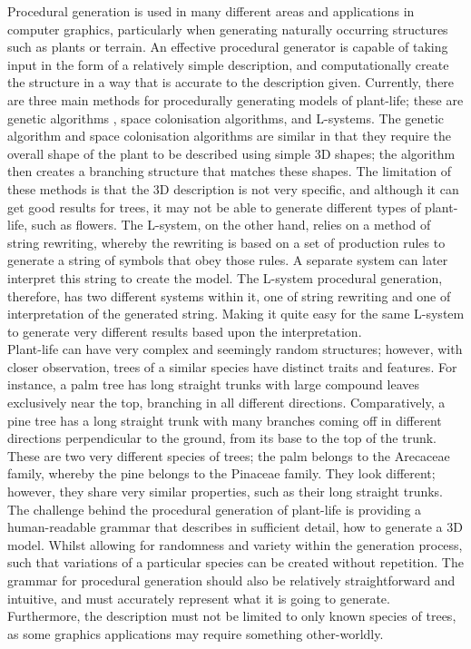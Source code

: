 Procedural generation is used in many different areas and applications in computer graphics, particularly when generating naturally occurring structures such as plants or terrain. An effective procedural generator is capable of taking input in the form of a relatively simple description, and computationally create the structure in a way that is accurate to the description given. Currently, there are three main methods for procedurally generating models of plant-life; these are genetic algorithms \cite{haubenwallner2017shapegenetics}, space colonisation algorithms\cite{juuso2017procedural}, and L-systems. The genetic algorithm and space colonisation algorithms are similar in that they require the overall shape of the plant to be described using simple 3D shapes; the algorithm then creates a branching structure that matches these shapes. The limitation of these methods is that the 3D description is not very specific, and although it can get good results for trees, it may not be able to generate different types of plant-life, such as flowers. The L-system, on the other hand, relies on a method of string rewriting, whereby the rewriting is based on a set of production rules to generate a string of symbols that obey those rules. A separate system can later interpret this string to create the model. The L-system procedural generation, therefore, has two different systems within it, one of string rewriting and one of interpretation of the generated string. Making it quite easy for the same L-system to generate very different results based upon the interpretation.\\

Plant-life can have very complex and seemingly random structures; however, with closer observation, trees of a similar species have distinct traits and features. For instance, a palm tree has long straight trunks with large compound leaves exclusively near the top, branching in all different directions. Comparatively, a pine tree has a long straight trunk with many branches coming off in different directions perpendicular to the ground, from its base to the top of the trunk. These are two very different species of trees; the palm belongs to the Arecaceae family, whereby the pine belongs to the Pinaceae family. They look different; however, they share very similar properties, such as their long straight trunks. The challenge behind the procedural generation of plant-life is providing a human-readable grammar that describes in sufficient detail, how to generate a 3D model. Whilst allowing for randomness and variety within the generation process, such that variations of a particular species can be created without repetition. The grammar for procedural generation should also be relatively straightforward and intuitive, and must accurately represent what it is going to generate. Furthermore, the description must not be limited to only known species of trees, as some graphics applications may require something other-worldly.


